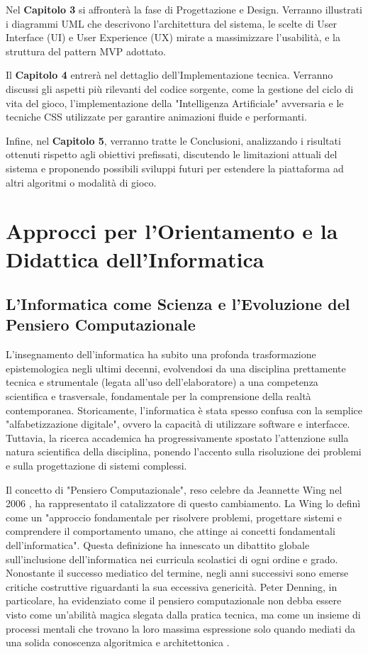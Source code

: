 \documentclass[openany]{theme/uniprthesis}
\begin{document}
Nel \textbf{Capitolo 3} si affronterà la fase di Progettazione e Design. Verranno illustrati i diagrammi UML che descrivono l'architettura del sistema, le scelte di User Interface (UI) e User Experience (UX) mirate a massimizzare l'usabilità, e la struttura del pattern MVP adottato.

Il \textbf{Capitolo 4} entrerà nel dettaglio dell'Implementazione tecnica. Verranno discussi gli aspetti più rilevanti del codice sorgente, come la gestione del ciclo di vita del gioco, l'implementazione della "Intelligenza Artificiale" avversaria e le tecniche CSS utilizzate per garantire animazioni fluide e performanti.

Infine, nel \textbf{Capitolo 5}, verranno tratte le Conclusioni, analizzando i risultati ottenuti rispetto agli obiettivi prefissati, discutendo le limitazioni attuali del sistema e proponendo possibili sviluppi futuri per estendere la piattaforma ad altri algoritmi o modalità di gioco.


\newpage

\chapter{Approcci per l'Orientamento e la Didattica dell'Informatica}

\section{L'Informatica come Scienza e l'Evoluzione del Pensiero Computazionale}
L'insegnamento dell'informatica ha subito una profonda trasformazione epistemologica negli ultimi decenni, evolvendosi da una disciplina prettamente tecnica e strumentale (legata all'uso dell'elaboratore) a una competenza scientifica e trasversale, fondamentale per la comprensione della realtà contemporanea. Storicamente, l'informatica è stata spesso confusa con la semplice "alfabetizzazione digitale", ovvero la capacità di utilizzare software e interfacce. Tuttavia, la ricerca accademica ha progressivamente spostato l'attenzione sulla natura scientifica della disciplina, ponendo l'accento sulla risoluzione dei problemi e sulla progettazione di sistemi complessi.

Il concetto di "Pensiero Computazionale", reso celebre da Jeannette Wing nel 2006 \cite{wing2006}, ha rappresentato il catalizzatore di questo cambiamento. La Wing lo definì come un "approccio fondamentale per risolvere problemi, progettare sistemi e comprendere il comportamento umano, che attinge ai concetti fondamentali dell'informatica". Questa definizione ha innescato un dibattito globale sull'inclusione dell'informatica nei curricula scolastici di ogni ordine e grado. Nonostante il successo mediatico del termine, negli anni successivi sono emerse critiche costruttive riguardanti la sua eccessiva genericità. Peter Denning, in particolare, ha evidenziato come il pensiero computazionale non debba essere visto come un'abilità magica slegata dalla pratica tecnica, ma come un insieme di processi mentali che trovano la loro massima espressione solo quando mediati da una solida conoscenza algoritmica e architettonica \cite{denning2017remaining}.
\end{document}

